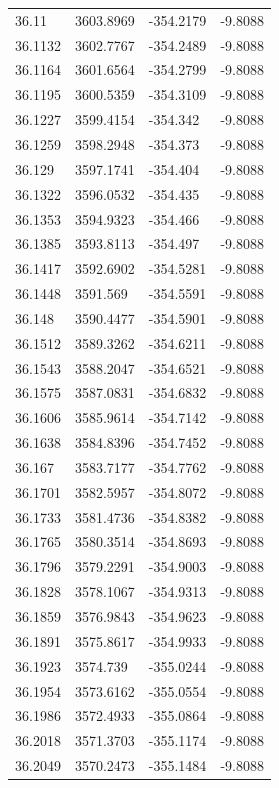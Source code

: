 \begin{table}[H]
\begin{tabular}{llll}
36.11 & 3603.8969 & -354.2179 & -9.8088 \\
36.1132 & 3602.7767 & -354.2489 & -9.8088 \\
36.1164 & 3601.6564 & -354.2799 & -9.8088 \\
36.1195 & 3600.5359 & -354.3109 & -9.8088 \\
36.1227 & 3599.4154 & -354.342 & -9.8088 \\
36.1259 & 3598.2948 & -354.373 & -9.8088 \\
36.129 & 3597.1741 & -354.404 & -9.8088 \\
36.1322 & 3596.0532 & -354.435 & -9.8088 \\
36.1353 & 3594.9323 & -354.466 & -9.8088 \\
36.1385 & 3593.8113 & -354.497 & -9.8088 \\
36.1417 & 3592.6902 & -354.5281 & -9.8088 \\
36.1448 & 3591.569 & -354.5591 & -9.8088 \\
36.148 & 3590.4477 & -354.5901 & -9.8088 \\
36.1512 & 3589.3262 & -354.6211 & -9.8088 \\
36.1543 & 3588.2047 & -354.6521 & -9.8088 \\
36.1575 & 3587.0831 & -354.6832 & -9.8088 \\
36.1606 & 3585.9614 & -354.7142 & -9.8088 \\
36.1638 & 3584.8396 & -354.7452 & -9.8088 \\
36.167 & 3583.7177 & -354.7762 & -9.8088 \\
36.1701 & 3582.5957 & -354.8072 & -9.8088 \\
36.1733 & 3581.4736 & -354.8382 & -9.8088 \\
36.1765 & 3580.3514 & -354.8693 & -9.8088 \\
36.1796 & 3579.2291 & -354.9003 & -9.8088 \\
36.1828 & 3578.1067 & -354.9313 & -9.8088 \\
36.1859 & 3576.9843 & -354.9623 & -9.8088 \\
36.1891 & 3575.8617 & -354.9933 & -9.8088 \\
36.1923 & 3574.739 & -355.0244 & -9.8088 \\
36.1954 & 3573.6162 & -355.0554 & -9.8088 \\
36.1986 & 3572.4933 & -355.0864 & -9.8088 \\
36.2018 & 3571.3703 & -355.1174 & -9.8088 \\
36.2049 & 3570.2473 & -355.1484 & -9.8088 \\

\end{tabular}
\end{table}
